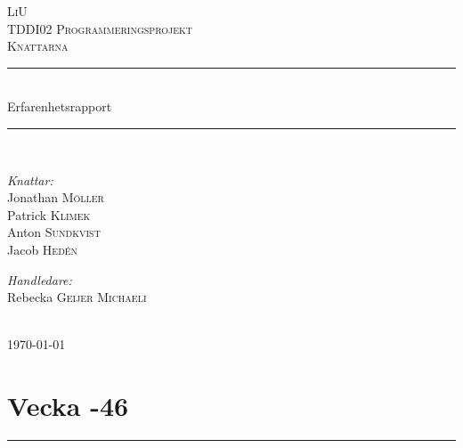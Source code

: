 \documentclass{article}
\newcommand{\HRule}{\rule{\linewidth}{0.5mm}}
\begin{document}
\begin{titlepage}
\center

\textsc{\LARGE LiU}\\[1.5cm]
\textsc{\Large TDDI02 Programmeringsprojekt}\\[0.5cm]
\textsc{\large Knattarna}\\[0.5cm]

\HRule\\[0.4cm]
{\huge Erfarenhetsrapport}\\[0.4cm]
\HRule\\[1.4cm]

\begin{minipage}{0.4\textwidth}
\begin{flushleft} \large
\emph{Knattar:}\\
Jonathan \textsc{Möller}\\
Patrick \textsc{Klimek}\\
Anton \textsc{Sundkvist}\\
Jacob \textsc{Hedén}\\
\end{flushleft}
\end{minipage}
\begin{minipage}{0.4\textwidth}
\begin{flushright} \large
\emph{Handledare:} \\
Rebecka \textsc{Geijer Michaeli} %
\end{flushright}
\end{minipage}\\[4cm]


{\large \today}\\[0.3cm] %

\end{titlepage}



\newpage

\section*{ {\center Vecka -46} }
\HRule \\[2 cm]
\end{document}
